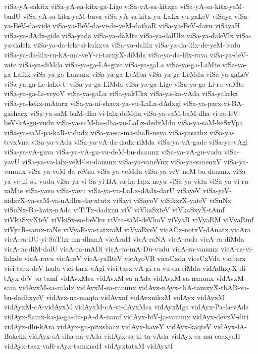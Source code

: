 {viSa-yA-sakitx
viSa-yA-sa-kitx-ga-Lige
viSa-yA-sa-kitxge
viSa-yA-sa-kitx-yeM-budU
viSa-yA-sa-kitx-yeM-buva
viSa-yA-sa-kitx-yu-LaLx-vu-gaLeV
viSaya
viSa-ya-BeV-da-vide
viSa-ya-BeV-da-vi-de-yeM-dathaR
viSa-ya-BeV-davu
viSayaH
viSa-ya-dAdx-gide
viSa-yada
viSa-ya-daMte
viSa-ya-dalUlx
viSa-ya-daleVlx
viSa-ya-dalelx
viSa-ya-da-lelx-si-kukxva
viSa-ya-dalilx
viSa-ya-da-lilx-de-yeM-budu
viSa-ya-da-lilx-ru-kA-ma-veY-ci-tarxyX-diMda
viSa-ya-da-lilx-ruva
viSa-ya-deV-vate
viSa-ya-diMda
viSa-ya-ga-LA-give
viSa-ya-gaLa
viSa-ya-ga-LaMte
viSa-ya-ga-Lalilx
viSa-ya-ga-Lanunx
viSa-ya-ga-LeMba
viSa-ya-ga-LeMdu
viSa-ya-gaLeV
viSa-ya-ga-Le-lalxvU
viSa-ya-ga-LiMda
viSa-ya-ga-Lige
viSa-ya-ga-Li-ru-vaMte
viSa-ya-ga-Li-veyoV
viSa-ya-gaLu
viSa-yakUkx
viSa-ya-ka-vAda
viSa-yakekx
viSa-ya-kekx-mAtarx
viSa-ya-ni-shacx-ya-vu-LaLx-dAdxgi
viSa-ya-parx-vi-BA-gashacx
viSa-ya-saM-baM-dha-vi-lalx-deMdu
viSa-ya-saM-baM-dha-vi-ra-leV-beV-kA-gu-vudu
viSa-ya-saM-ba-dha-vu-LaLx-dedxMdu
viSa-ya-saM-keSxVpa
viSa-ya-saM-pa-kaR-vidudx
viSa-ya-sa-ma-thaR-neya
viSa-yasathx
viSa-ya-tevxVna
viSa-ya-vAda
viSa-ya-vA-da-dadx-riMda
viSa-ya-vA-gade
viSa-ya-vAgi
viSa-ya-vA-guva
viSa-ya-vA-gu-vu-deM-bu-danunx
viSa-ya-vA-gu-vudu
viSa-yavU
viSa-ya-va-lalx-veM-bu-danunx
viSa-ya-vaneVnx
viSa-ya-vanenxV
viSa-ya-vanunx
viSa-ya-veM-da-reVnu
viSa-ya-veMdu
viSa-ya-veV-neM-bu-danunx
viSa-ya-ve-ni-su-vudu
viSa-ya-vi-Sa-yi-BA-va-ka-lapx-neyu
viSa-ya-vidu
viSa-ya-vi-ru-vaMte
viSa-yavo
viSa-yavu
viSa-ya-vu-LaLx-dAdx-darU
viSayeV
viSa-yeV-nidxrX-ya-saM-va-nAdhx-dayxtutx
viSayi
viSayoV
viSikxrX-yateV
viSuNx
viSuNx-Ba-katx-nAda
viTiTx-dadxnu
viV
viVkaSxteV
viVkaSxyX-tAmf
viVkaSxyXteV
viVkiSx-sa-beVku
viVta-saM-deVhoV
viVyaR
viVyaRM
viVyaRmf
viVyaR-samx-raNe
viVyaR-va-tatxraM
viVyaRveV
vicACx-notxV-dAnatx
vicAra
vicA-ra-BU-yi-SaThx-ma-dhunA
vicAraH
vicA-raNA
vicA-rada
vicA-ra-diMda
vicA-ra-diM-dalU
vicA-ra-mADi
vicA-ra-mA-Du-vudu
vicA-ra-vanunx
vicA-ra-vi-lalxde
vicA-ravu
vicAroV
vicA-yaRteV
vicAyoVR
vicaCxda
viceCxVda
vicitarx
vici-tarx-deV-hada
vici-tarx-vAgi
vici-tarx-vA-gi-ru-vu-da-riMda
vidAdhxyX-di-tAyx-deV-va-tamf
vidAvxMsa
vidAvxM-sa-nAda
vidAvxM-sa-nanunx
vidAvxM-sara
vidAvxM-sa-ralalx
vidAvxM-sa-ranunx
vidAvx-nAyx-thA-tamxyX-thAR-va-bu-dadhxyeV
vidAvx-na-maqta
vidAvxnf
vidAvxnikxM
vidAyx
vidAyxM
vidAyxM-cA-vidAyxM
vidAyxM-cA-vi-dAyxMca
vidAyxMga
vidAyx-Pa-la-vAda
vidAyx-Samx-ka-ja-ga-du-pA-dA-namf
vidAyx-biV-ja-vanunx
vidAyx-devxV-diti
vidAyx-dhi-kAra
vidAyx-gu-pitxshacx
vidAyx-haveY
vidAyx-kaqteV
vidAyx-lA-Bakekx
vidAyx-sA-dha-na-vAda
vidAyx-sa-hi-ta-vAda
vidAyx-sa-mu-cacxyaH
vidAyx-tasx-vaR-sAyx-tamxnaH
vidAyxtatxM
vidAyxtf
}
